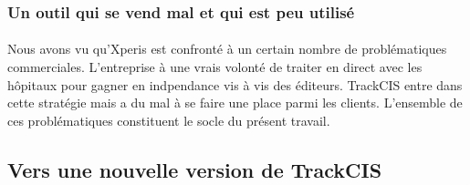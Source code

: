 			\paragraph{}%
			
		\subsubsection{Un outil qui se vend mal et qui est peu utilisé}
			\paragraph{}%
			
			\paragraph{}%
			
			\paragraph{}%
			
			\paragraph{}
			Nous avons vu qu'Xperis est confronté à un certain nombre de problématiques
			commerciales. L'entreprise à une vrais volonté de traiter en direct avec les
			hôpitaux pour gagner en indpendance vis à vis des éditeurs. TrackCIS entre
			dans cette stratégie mais a du mal à se faire une place parmi les
			clients.\newline
			L'ensemble de ces problématiques constituent le socle du présent travail.
	
	\subsection{Vers une nouvelle version de TrackCIS}

